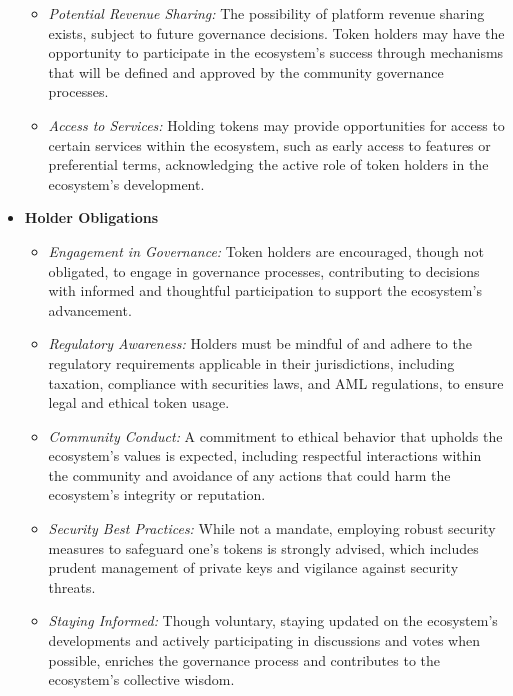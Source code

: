 \documentclass[a4paper]{article}
\theoremstyle{definition}
\begin{document}
\begin{appendices}
\begin{itemize}
\begin{itemize}
        \item \textit{Potential Revenue Sharing:} The possibility of platform revenue sharing exists, subject to future governance decisions. Token holders may have the opportunity to participate in the ecosystem's success through mechanisms that will be defined and approved by the community governance processes.
        
        \item \textit{Access to Services:} Holding tokens may provide opportunities for access to certain services within the ecosystem, such as early access to features or preferential terms, acknowledging the active role of token holders in the ecosystem's development.
    \end{itemize}
    
    \item \textbf{Holder Obligations}
    \begin{itemize}
        \item \textit{Engagement in Governance:} Token holders are encouraged, though not obligated, to engage in governance processes, contributing to decisions with informed and thoughtful participation to support the ecosystem's advancement.
        
        \item \textit{Regulatory Awareness:} Holders must be mindful of and adhere to the regulatory requirements applicable in their jurisdictions, including taxation, compliance with securities laws, and AML regulations, to ensure legal and ethical token usage.
        
        \item \textit{Community Conduct:} A commitment to ethical behavior that upholds the ecosystem's values is expected, including respectful interactions within the community and avoidance of any actions that could harm the ecosystem's integrity or reputation.
        
        \item \textit{Security Best Practices:} While not a mandate, employing robust security measures to safeguard one's tokens is strongly advised, which includes prudent management of private keys and vigilance against security threats.
        
        \item \textit{Staying Informed:} Though voluntary, staying updated on the ecosystem's developments and actively participating in discussions and votes when possible, enriches the governance process and contributes to the ecosystem's collective wisdom.
    \end{itemize}
\end{itemize}


\end{appendices}
\end{document}
